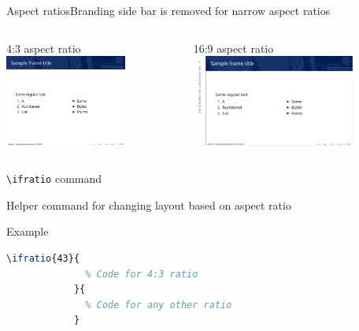 \documentclass[aspectratio=169]{beamer}
\begin{document}
\begin{frame}{Aspect ratios}{Branding side bar is removed for narrow aspect ratios}
	\begin{columns}
		\begin{column}{0.5\textwidth}
			\begin{block}{4:3 aspect ratio}
				\centering
				\includegraphics[height=3cm]{ar43.png}
			\end{block}
		\end{column}
		\begin{column}{0.5\textwidth}
			\begin{block}{16:9 aspect ratio}
				\centering
				\includegraphics[height=3cm]{ar169.png}
			\end{block}
		\end{column}
	\end{columns}
\end{frame}

\begin{frame}[fragile]{\texttt{\textbackslash{}ifratio} command}
	\begin{block}{}
		Helper command for changing layout based on aspect ratio
	\end{block}
	\begin{exampleblock}{Example}
		\begin{lstlisting}[language=TeX, gobble=3, tabsize=1]
			\ifratio{43}{
			  % Code for 4:3 ratio
			}{
			  % Code for any other ratio
			}
		\end{lstlisting}
	\end{exampleblock}
\end{frame}
\end{document}
